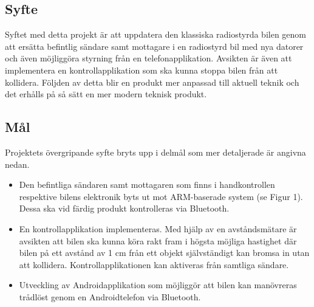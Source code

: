 \documentclass[a4paper]{article}
\begin{document}
\subsection{Syfte}

Syftet med detta projekt är att uppdatera den klassiska radiostyrda bilen genom att ersätta befintlig sändare samt mottagare i en radiostyrd bil med nya datorer och även möjliggöra styrning från en telefonapplikation. Avsikten är även att implementera en kontrollapplikation som ska kunna stoppa bilen från att kollidera. Följden av detta blir en produkt mer anpassad till aktuell teknik och det erhålls på så sätt en mer modern teknisk produkt.


\subsection{Mål}
Projektets övergripande syfte bryts upp i delmål som mer detaljerade är angivna nedan.

\begin{itemize}
\item Den befintliga sändaren samt mottagaren som finns i handkontrollen respektive bilens elektronik byts ut mot ARM-baserade system (se Figur 1). Dessa ska vid färdig produkt kontrolleras via Bluetooth.
\item En kontrollapplikation implementeras. Med hjälp av en avståndsmätare är avsikten att bilen ska kunna köra rakt fram i högsta möjliga hastighet där bilen på ett avstånd av 1 cm från ett objekt självständigt kan bromsa in utan att kollidera. Kontrollapplikationen kan aktiveras från samtliga sändare.
\item Utveckling av Androidapplikation som möjliggör att bilen kan manövreras trådlöst genom en Androidtelefon via Bluetooth.
\end{itemize}
\end{document}
